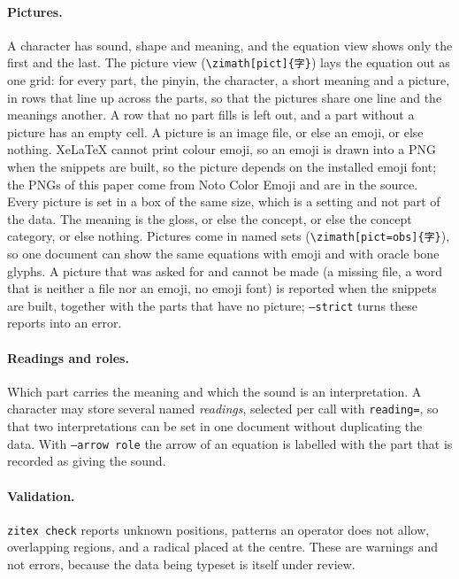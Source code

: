 \documentclass[11pt]{article}
\newcommand{\cmd}[1]{\texttt{\textbackslash #1}}
\begin{document}
\paragraph{Pictures.} A character has sound, shape and meaning, and the equation view shows only the first and the last. The picture view
(\cmd{zimath}\texttt{[pict]\{字\}}) lays the equation out as one grid: for every part, the pinyin, the character, a short meaning and a picture,
in rows that line up across the parts, so that the pictures share one line and the meanings another. A row that no part fills is left out, and
a part without a picture has an empty cell. A picture is an image file, or else an emoji, or else nothing. XeLaTeX cannot print colour emoji, so an
emoji is drawn into a PNG when the snippets are built, so the picture depends on the installed emoji font; the PNGs of this paper come from Noto Color Emoji
and are in the source. Every picture is set in a box of the same size, which is a setting and not part of the data. The meaning is the gloss, or else the concept, or else the concept category, or else nothing. Pictures come in named sets
(\cmd{zimath}\texttt{[pict=obs]\{字\}}), so one document can show the same equations with emoji and with oracle bone glyphs.
A picture that was asked for and cannot be made (a missing file, a word that is neither a file nor an emoji, no emoji font) is reported when the snippets
are built, together with the parts that have no picture; \texttt{--strict} turns these reports into an error.

\paragraph{Readings and roles.} Which part carries the meaning and which the sound is an interpretation. A character may store several named
\emph{readings}, selected per call with \texttt{reading=}, so that two interpretations can be set in one document without duplicating the data. With
\texttt{--arrow role} the arrow of an equation is labelled with the part that is recorded as giving the sound.

\paragraph{Validation.} \texttt{zitex check} reports unknown positions, patterns an operator does not allow, overlapping regions, and a radical placed
at the centre. These are warnings and not errors, because the data being typeset is itself under review.
\end{document}
